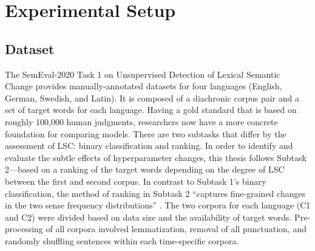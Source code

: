 \section{Experimental Setup}
\label{sec:exp-setup}

\subsection{Dataset}

The SemEval-2020 Task 1 on Unsupervised Detection of Lexical Semantic Change \citep{schlechtweg-etal-2020-semeval} provides manually-annotated datasets for four languages (English, German, Swedish, and Latin). It is composed of a diachronic corpus pair and a set of target words for each language. Having a gold standard that is based on roughly 100,000 human judgments, researchers now have a more concrete foundation for comparing models. There are two subtasks that differ by the assessment of LSC: binary classification and ranking. In order to identify and evaluate the subtle effects of hyperparameter changes, this thesis follows Subtask 2—based on a ranking of the target words depending on the degree of LSC between the first and second corpus. In contrast to Subtask 1’s binary classification, the method of ranking in Subtask 2 “captures fine-grained changes in the two sense frequency distributions” \citep{schlechtweg-etal-2020-semeval}. The two corpora for each language (C1 and C2) were divided based on data size and the availability of target words. Pre-processing of all corpora involved lemmatization, removal of all punctuation, and randomly shuffling sentences within each time-specific corpora.

